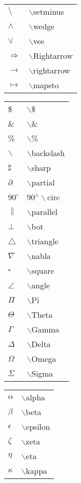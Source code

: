 \documentclass[10pt]{beamer}
\begin{document}
\begin{frame}
\begin{tabular}{ll}
$\setminus $ &  $\backslash$setminus \\
$\wedge $ &  $\backslash$wedge \\
$\vee $ &  $\backslash$vee \\
$\Rightarrow$ &  $\backslash$Rightarrow \\
$\rightarrow$ &  $\backslash$rightarrow \\
$\mapsto$ &  $\backslash$mapsto \\
\end{tabular}
\hspace*{1ex}
\begin{tabular}{ll}
\$ & $\backslash$\$ \\
\& & $\backslash$\& \\
\% & $\backslash$\% \\
$\backslash$ & $\backslash$backslash \\
$\sharp$ & $\backslash$sharp \\
$\partial$ &  $\backslash$partial \\
$90^\circ$ &  90$^\wedge\backslash$circ \\
$\parallel$ &  $\backslash$parallel \\
$\bot$ &  $\backslash$bot \\
$\triangle$ &  $\backslash$triangle \\
$\nabla$ &   $\backslash$nabla \\
$\square$ &  $\backslash$square \\
$\angle$ &  $\backslash$angle \\
$\Pi$ &  $\backslash$Pi \\
$\Theta$ &  $\backslash$Theta \\
$\Gamma$ &  $\backslash$Gamma \\
$\Delta$ &  $\backslash$Delta \\
$\Omega$ &  $\backslash$Omega \\
$\Sigma$ &  $\backslash$Sigma \\
\end{tabular}
\hspace*{1ex}
\begin{tabular}{ll}
$\alpha$ &  $\backslash$alpha \\
$\beta$ &  $\backslash$beta \\
$\epsilon$ &  $\backslash$epsilon \\
$\zeta$ &  $\backslash$zeta \\
$\eta$ &  $\backslash$eta \\
$\kappa$ &  $\backslash$kappa \\

\end{tabular}
\end{frame}
\end{document}
